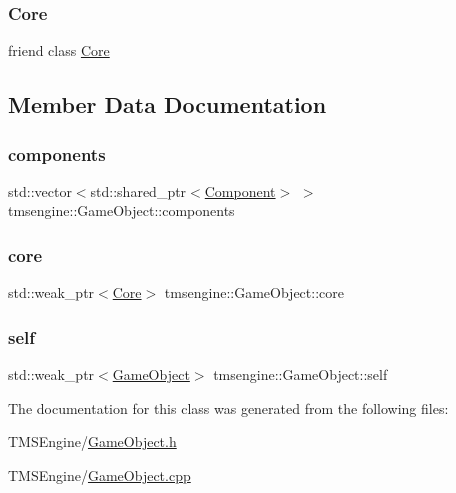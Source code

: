 \subsubsection{\texorpdfstring{Core}{Core}}
{\footnotesize\ttfamily friend class \hyperlink{classtmsengine_1_1_core}{Core}\hspace{0.3cm}{\ttfamily [friend]}}



\subsection{Member Data Documentation}
\mbox{\label{classtmsengine_1_1_game_object_a94c0947df66676bfce83cd1d28ef8a32}} 
\subsubsection{\texorpdfstring{components}{components}}
{\footnotesize\ttfamily std\+::vector$<$std\+::shared\+\_\+ptr$<$\hyperlink{classtmsengine_1_1_component}{Component}$>$ $>$ tmsengine\+::\+Game\+Object\+::components\hspace{0.3cm}{\ttfamily [private]}}

\mbox{\label{classtmsengine_1_1_game_object_ae7f1027d4e1fdc66ec0a5d383136165b}} 
\subsubsection{\texorpdfstring{core}{core}}
{\footnotesize\ttfamily std\+::weak\+\_\+ptr$<$\hyperlink{classtmsengine_1_1_core}{Core}$>$ tmsengine\+::\+Game\+Object\+::core\hspace{0.3cm}{\ttfamily [private]}}

\mbox{\label{classtmsengine_1_1_game_object_a5b74bdb7c894b24eaf4ef56610b5f2e6}} 
\subsubsection{\texorpdfstring{self}{self}}
{\footnotesize\ttfamily std\+::weak\+\_\+ptr$<$\hyperlink{classtmsengine_1_1_game_object}{Game\+Object}$>$ tmsengine\+::\+Game\+Object\+::self\hspace{0.3cm}{\ttfamily [private]}}



The documentation for this class was generated from the following files\+:\begin{DoxyCompactItemize}
\item 
T\+M\+S\+Engine/\hyperlink{_game_object_8h}{Game\+Object.\+h}\item 
T\+M\+S\+Engine/\hyperlink{_game_object_8cpp}{Game\+Object.\+cpp}\end{DoxyCompactItemize}
